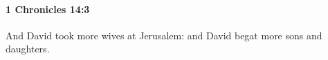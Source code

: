 
		\paragraph{1 Chronicles 14:3} %
			\label{1CHRONICLES-14-3}

			And David took more wives at Jerusalem: and David begat more sons and daughters.


